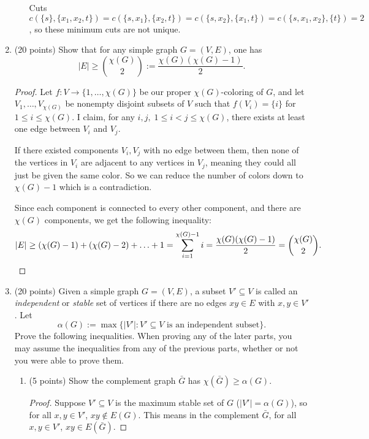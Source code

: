 \documentclass[11pt]{article}
\newcommand{\n}{\vspace{0.3cm}}
\begin{document}
\begin{enumerate}
\begin{enumerate}[label=(\alph*)]
\begin{center}
          \end{center}
          Cuts \(c(\{s\},\{x_1,x_2,t\}) = c(\{s,x_1\},\{x_2,t\}) = c(\{s,x_2\},\{x_1,t\}) = c(\{s,x_1,x_2\},\{t\}) = 2\), so these minimum cuts are not unique.
      \end{enumerate} \n

    \item (20 points) Show that for any simple graph \(G = (V,E)\), one has
      \[|E| \geq \binom{\chi(G)}{2} := \frac{\chi(G)(\chi(G)-1)}{2}.\]
      \begin{proof}
        Let \(f \colon V \to \{1, \hdots, \chi(G)\}\) be our proper \(\chi(G)\)-coloring of \(G\), and let \(V_1, \hdots, V_{\chi(G)}\) be nonempty disjoint subsets of \(V\) such that \(f(V_i) = \{i\}\) for \(1 \leq i \leq \chi(G)\).  I claim, for any \(i,j, \; 1 \leq i < j \leq \chi(G)\), there exists at least one edge between \(V_i\) and \(V_j\). \n

        If there existed components \(V_i,V_j\) with no edge between them, then none of the vertices in \(V_i\) are adjacent to any vertices in \(V_j\), meaning they could all just be given the same color.  So we can reduce the number of colors down to \(\chi(G)-1\) which is a contradiction. \n

        Since each component is connected to every other component, and there are \(\chi(G)\) components, we get the following inequality:
        \[|E| \geq (\chi(G)-1) + (\chi(G)-2) + \hdots + 1 = \sum_{i=1}^{\chi(G)-1} i = \frac{\chi(G)(\chi(G)-1)}{2} = \binom{\chi(G)}{2}. \qedhere\]
      \end{proof}
      

    \item (20 points) Given a simple graph \(G = (V,E)\), a subset \(V' \subseteq V\) is called an \textit{independent} or \textit{stable} set of vertices if there are no edges \(xy \in E\) with \(x,y \in V'\). Let
      \[\alpha(G) := \max \{|V'| \colon V' \subseteq V \text{ is an independent subset}\}.\]
      Prove the following inequalities.  When proving any of the later parts, you may assume the inequalities from any of the previous parts, whether or not you were able to prove them.
      \begin{enumerate}[label=(\alph*)]
        \item (5 points) Show the complement graph \(\bar G\) has \(\chi(\bar G) \geq \alpha(G)\).
          \begin{proof}
            Suppose \(V' \subseteq V\) is the maximum stable set of \(G\) (\(|V'| = \alpha(G)\)), so for all \(x,y \in V'\), \(xy \not\in E(G)\).  This means in the complement \(\bar G\), for all \(x,y \in V'\), \(xy \in E(\bar G)\). \n


\end{proof}
\end{enumerate}
\end{enumerate}
\end{document}
